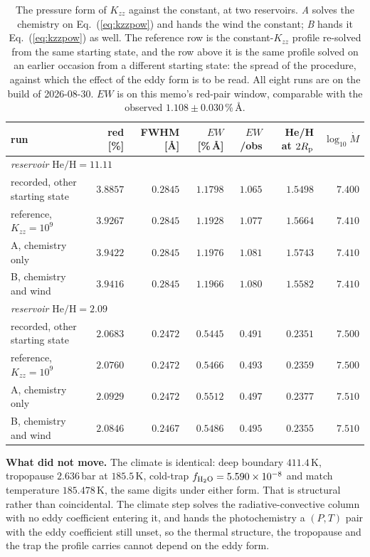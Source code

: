 \documentclass[english,a4paper]{my_memo}
\begin{document}
\begin{table}[htbp]\centering\small
\setlength{\tabcolsep}{5pt}
\caption{The pressure form of $K_{zz}$ against the constant, at two
reservoirs. \emph{A} solves the chemistry on Eq.~(\ref{eq:kzzpow}) and hands
the wind the constant; \emph{B} hands it Eq.~(\ref{eq:kzzpow}) as well. The
reference row is the constant-$K_{zz}$ profile re-solved from the same
starting state, and the row above it is the same profile solved on an earlier
occasion from a different starting state: the spread of the procedure,
against which the effect of the eddy form is to be read. All eight runs are
on the build of 2026-08-30. $EW$ is on this memo's red-pair window,
comparable with the observed $1.108 \pm 0.030$\,\%\,\AA.}
\label{tab:kzzform}
\begin{tabular}{lrrrrrr}
\toprule
run & red [\%] & FWHM [\AA] & $EW$ [\%\,\AA] & $EW$/obs &
He/H at $2R_{\rm p}$ & $\log_{10}\dot M$ \\
\midrule
\multicolumn{7}{l}{\emph{reservoir} $\mathrm{He/H} = 11.11$} \\
recorded, other starting state   & $3.8857$ & $0.2845$ & $1.1798$ & $1.065$ & $1.5498$ & $7.400$ \\
reference, $K_{zz} = 10^{9}$ & $3.9267$ & $0.2845$ & $1.1928$ & $1.077$ & $1.5664$ & $7.410$ \\
A, chemistry only      & $3.9422$ & $0.2845$ & $1.1976$ & $1.081$ & $1.5743$ & $7.410$ \\
B, chemistry and wind  & $3.9416$ & $0.2845$ & $1.1966$ & $1.080$ & $1.5582$ & $7.410$ \\
\midrule
\multicolumn{7}{l}{\emph{reservoir} $\mathrm{He/H} = 2.09$} \\
recorded, other starting state   & $2.0683$ & $0.2472$ & $0.5445$ & $0.491$ & $0.2351$ & $7.500$ \\
reference, $K_{zz} = 10^{9}$ & $2.0760$ & $0.2472$ & $0.5466$ & $0.493$ & $0.2359$ & $7.500$ \\
A, chemistry only      & $2.0929$ & $0.2472$ & $0.5512$ & $0.497$ & $0.2377$ & $7.510$ \\
B, chemistry and wind  & $2.0846$ & $0.2467$ & $0.5486$ & $0.495$ & $0.2355$ & $7.510$ \\
\bottomrule
\end{tabular}
\end{table}

\medskip
\noindent\textbf{What did not move.} The climate is identical: deep boundary
$411.4$\,K, tropopause $2.636$\,bar at $185.5$\,K, cold-trap
$f_{\rm H_2O} = 5.590\times10^{-8}$ and match temperature $185.478$\,K, the
same digits under either form. That is structural rather than coincidental.
The climate step solves the radiative-convective column with no eddy
coefficient entering it, and hands the photochemistry a $(P,T)$ pair with the
eddy coefficient still unset, so the thermal structure, the tropopause and
the trap the profile carries cannot depend on the eddy form.
\end{document}
